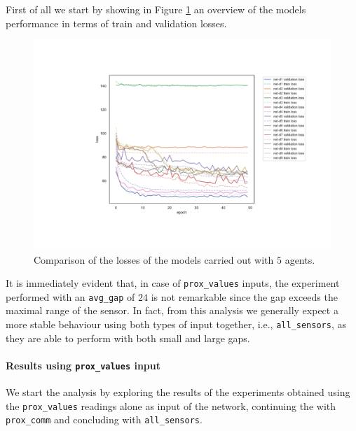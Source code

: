 First of all we start by showing in Figure \ref{fig:distloss} an overview of the 
models performance in terms of train and validation losses. 
\begin{figure}[!htb]
	\centering
	\includegraphics[width=.85\textwidth]{contents/images/task1/loss-distributed-all@}%
	\caption[Comparison of losses of the first set of 
	experiments.]{Comparison of 
	the losses of the models carried out with $5$ agents.}
	\label{fig:distloss}
\end{figure}
It is immediately evident that, in case of \texttt{prox\_values} inputs, the 
experiment performed with an \texttt{avg\_gap} of $24$ is not remarkable since 
the gap exceeds the maximal range of the sensor. In fact, from this analysis we 
generally expect a more stable behaviour using both types of input together, i.e.,
\texttt{all\_sensors}, as they are able to perform with both small and large gaps.

\paragraph*{Results using \texttt{prox\_values} input}
\label{para:1}
We start the analysis by exploring the results of the experiments obtained 
using the \texttt{prox\_values} readings alone as input of the network, continuing 
the with \texttt{prox\_comm} and concluding with \texttt{all\_sensors}.

